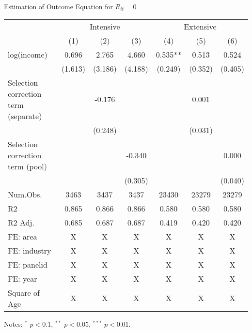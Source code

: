 \documentclass[
  ignorenonframetext,
  aspectratio=169,
]{beamer}
\begin{document}
\begin{frame}{Estimation of Outcome Equation for \(R_{it} = 0\)}
\protect\hypertarget{estimation-of-outcome-equation-for-r_it-0}{}
\begin{table}
\centering
\fontsize{7}{9}\selectfont
\begin{threeparttable}
\begin{tabular}[t]{lcccccc}
\toprule
\multicolumn{1}{c}{ } & \multicolumn{3}{c}{Intensive} & \multicolumn{3}{c}{Extensive} \\
\cmidrule(l{3pt}r{3pt}){2-4} \cmidrule(l{3pt}r{3pt}){5-7}
  & (1) & (2) & (3) & (4) & (5) & (6)\\
\midrule
log(income) & 0.696 & 2.765 & 4.660 & 0.535** & 0.513 & 0.524\\
 & (1.613) & (3.186) & (4.188) & (0.249) & (0.352) & (0.405)\\
Selection correction term (separate) &  & -0.176 &  &  & 0.001 & \\
 &  & (0.248) &  &  & (0.031) & \\
Selection correction term (pool) &  &  & -0.340 &  &  & 0.000\\
 &  &  & (0.305) &  &  & (0.040)\\
\midrule
Num.Obs. & 3463 & 3437 & 3437 & 23430 & 23279 & 23279\\
R2 & 0.865 & 0.866 & 0.866 & 0.580 & 0.580 & 0.580\\
R2 Adj. & 0.685 & 0.687 & 0.687 & 0.419 & 0.420 & 0.420\\
FE: area & X & X & X & X & X & X\\
FE: industry & X & X & X & X & X & X\\
FE: panelid & X & X & X & X & X & X\\
FE: year & X & X & X & X & X & X\\
Square of Age & X & X & X & X & X & X\\
\bottomrule
\end{tabular}
\begin{tablenotes}
\item Notes: $^{*}$ $p < 0.1$, $^{**}$ $p < 0.05$, $^{***}$ $p < 0.01$.
\end{tablenotes}
\end{threeparttable}
\end{table}
\end{frame}
\end{document}
